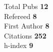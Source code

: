 Total Pubs \textbf{12}\\Refereed \textbf{8}\\First Author \textbf{8}\\Citations \textbf{252}\\h-index \textbf{9}\\